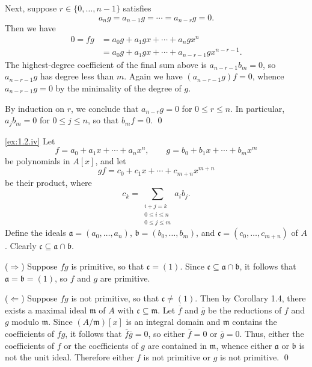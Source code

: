 Next, suppose $r\in\{0,\ldots,n-1\}$ satisfies
\begin{equation*}
a_n g
= a_{n-1} g
= \cdots
= a_{n-r} g
= 0.
\end{equation*}
Then we have
\begin{align*}
0
= f g
&= a_0 g + a_1 g x + \cdots + a_n g x^n
\\&= a_0 g + a_1 g x + \cdots + a_{n-r-1} g x^{n-r-1}.
\end{align*}
The highest-degree coefficient of the final sum above is $a_{n-r-1} b_m = 0$, so $a_{n-r-1} g$ has degree less than $m$.
Again we have $(a_{n-r-1} g) f = 0$, whence $a_{n-r-1} g = 0$ by the minimality of the degree of $g$.

By induction on $r$, we conclude that $a_{n-r} g = 0$ for $0 \leq r \leq n$.
In particular, $a_j b_m = 0$ for $0\leq j \leq n$, so that $b_m f = 0$.
\qed

\noindent
\ref{ex:1.2.iv}
Let
\begin{equation*}
f = a_0 + a_1 x + \cdots + a_n x^n,
\qquad
g = b_0 + b_1 x + \cdots + b_m x^m
\end{equation*}
be polynomials in $A[x]$, and let
\begin{equation*}
g f = c_0 + c_1 x + \cdots + c_{m+n} x^{m+n}
\end{equation*}
be their product, where
\begin{equation*}
c_k = \sum_{\substack{i+j=k \\ 0\leq i\leq n\\0\leq j\leq m}} a_i b_j.
\end{equation*}
Define the ideals $\mathfrak a = (a_0,\ldots,a_n)$, $\mathfrak b = (b_0,\ldots,b_m)$, and $\mathfrak c = (c_0,\ldots,c_{m+n})$ of $A$.
Clearly $\mathfrak c \subseteq \mathfrak a \cap \mathfrak b$.

($\Rightarrow$)
Suppose $f g$ is primitive, so that $\mathfrak c = (1)$.
Since $\mathfrak c \subseteq \mathfrak a \cap \mathfrak b$, it follows that $\mathfrak a = \mathfrak b = (1)$, so $f$ and $g$ are primitive.

($\Leftarrow$)
Suppose $f g$ is not primitive, so that $\mathfrak c \neq (1)$.
Then by Corollary 1.4, there exists a maximal ideal $\mathfrak m$ of $A$ with $\mathfrak c \subseteq \mathfrak m$.
Let $\overline f$ and $\overline g$ be the reductions of $f$ and $g$ modulo $\mathfrak m$.
Since $(A/\mathfrak m)[x]$ is an integral domain and $\mathfrak m$ contains the coefficients of $f g$, it follows that $\overline f \overline g = 0$, so either $\overline f = 0$ or $\overline g = 0$.
Thus, either the coefficients of $f$ or the coefficients of $g$ are contained in $\mathfrak m$, whence either $\mathfrak a$ or $\mathfrak b$ is not the unit ideal.
Therefore either $f$ is not primitive or $g$ is not primitive.
\qed





